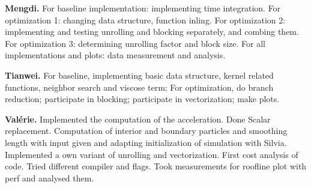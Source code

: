 \documentclass[letterpaper]{article}
\newcommand{\mypar}[1]{{\bf #1.}}
\begin{document}
\mypar{Mengdi}
For baseline implementation: implementing time integration.
For optimization 1: changing data structure, function inling. 
For optimization 2: implementing and testing unrolling and blocking separately, and combing them.
For optimization 3: determining unrolling factor and block size. 
For all implementations and plots: data measurement and analysis.

\mypar{Tianwei}
For baseline, implementing basic data structure, kernel related functions, neighbor search and viscose term;
For optimization, do branch reduction; participate in blocking; participate in vectorization; make plots.

\mypar{Valérie} Implemented the computation of the acceleration. Done Scalar replacement. Computation of interior and boundary particles and smoothing length with input given and adapting initialization of simulation with Silvia. Implemented a own variant of unrolling and vectorization. First cost analysis of code. Tried different compiler and flags. Took measurements for roofline plot with perf and analysed them.



\end{document}
